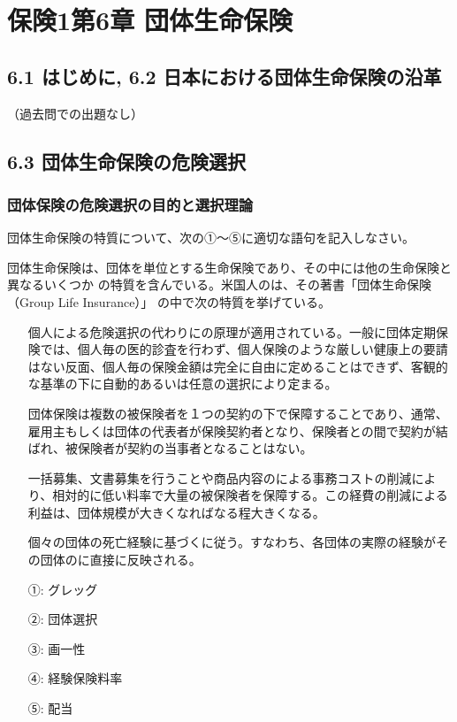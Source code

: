 \documentclass[report,gutter=10mm,fore-edge=10mm,uplatex,dvipdfmx]{jlreq}
\begin{document}
\chapter{保険1第6章 団体生命保険}
\section{6.1 はじめに,  6.2 日本における団体生命保険の沿革}
（過去問での出題なし）
\section{6.3 団体生命保険の危険選択}
\subsection{団体保険の危険選択の目的と選択理論}

団体生命保険の特質について、次の①～⑤に適切な語句を記入しなさい。

団体生命保険は、団体を単位とする生命保険であり、その中には他の生命保険と異なるいくつか
の特質を含んでいる。米国人のは、その著書「団体生命保険（Group Life Insurance）」
の中で次の特質を挙げている。

\begin{itemize}
\item[]  個人による危険選択の代わりにの原理が適用されている。一般に団体定期保険では、個人毎の医的診査を行わず、個人保険のような厳しい健康上の要請はない反面、個人毎の保険金額は完全に自由に定めることはできず、客観的な基準の下に自動的あるいは任意の選択により定まる。
\item[]  団体保険は複数の被保険者を１つの契約の下で保障することであり、通常、雇用主もしくは団体の代表者が保険契約者となり、保険者との間で契約が結ばれ、被保険者が契約の当事者となることはない。
\item[]  一括募集、文書募集を行うことや商品内容のによる事務コストの削減により、相対的に低い料率で大量の被保険者を保障する。この経費の削減による利益は、団体規模が大きくなればなる程大きくなる。
\item[]  個々の団体の死亡経験に基づくに従う。すなわち、各団体の実際の経験がその団体のに直接に反映される。
\end{itemize}

\answer{}
\begin{itemize}
\item[ ①: ]  グレッグ 
\item[ ②: ]  団体選択 
\item[ ③: ]  画一性 
\item[ ④: ]  経験保険料率 
\item[ ⑤: ]  配当
\end{itemize}
\end{document}
